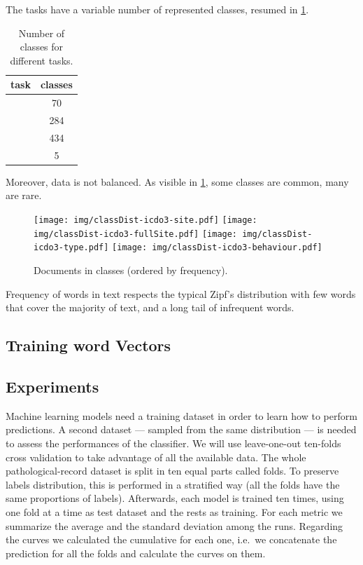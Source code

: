 The tasks have a variable number of represented classes, resumed in
\cref{fig:numClasses}.
\begin{table}
  \center
  \caption{Number of classes for different tasks.}
  \label{fig:numClasses}
  \begin{tabular}{|l|c|}
    \hline
    task & classes \\
    \hline
    \site{} & 70 \\
    \fullSite{} & 284 \\
    \type{} & 434 \\
    \behaviour{} & 5 \\
    \hline
  \end{tabular}
\end{table}
Moreover, data is not balanced. As visible in \cref{fig:classDist},
some classes are common, many are rare.
\begin{figure}
  \centering
  \texttt{[image: img/classDist-icdo3-site.pdf]}
  \texttt{[image: img/classDist-icdo3-fullSite.pdf]}
  \texttt{[image: img/classDist-icdo3-type.pdf]}
  \texttt{[image: img/classDist-icdo3-behaviour.pdf]}
  \caption{Documents in classes (ordered by
    frequency).}
  \label{fig:classDist}
\end{figure}

Frequency of words in text
respects the typical Zipf's distribution with few words that cover the
majority of text, and a long tail of infrequent words.


\subsection{Training word Vectors}

\subsection{Experiments}
\label{sec:experiments}
Machine learning models need a training dataset in order to learn how
to perform predictions. A second dataset — sampled from the same
distribution — is needed to assess the performances of the
classifier. We will use leave-one-out ten-folds cross validation
to take advantage of all the available data. The whole
pathological-record dataset is split in ten equal parts called
folds. To preserve labels distribution, this is performed in a
stratified way (all the folds have the same proportions of
labels). Afterwards, each
model is trained ten times, using one fold at a time as test
dataset and the rests as training. For each metric we summarize the
average and the standard deviation among the runs. Regarding the
curves we calculated the cumulative for each 
one, i.e.\ we concatenate the prediction for all the folds and
calculate the curves on them. 


